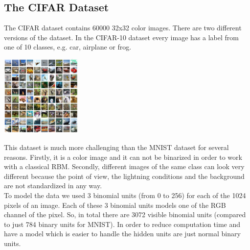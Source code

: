 \documentclass[a4paper]{scrartcl}
\begin{document}
\subsection{The CIFAR Dataset}
The CIFAR dataset contains 60000 32x32 color images. There are two different versions of the dataset. In the CIFAR-10 dataset every image has a label from one of 10 classes, e.g. car, airplane or frog. 
\begin{center}
\includegraphics[width=4cm]{images/cifar-10.png}
\end{center} 
This dataset is much more challenging than the MNIST dataset for several reasons. Firstly, it is a color image and it can not be binarized in order to work with a classical RBM. Secondly, different images of the same class can look very different because the point of view, the lightning conditions and the background are not standardized in any way. \\
To model the data we used 3 binomial units (from 0 to 256) for each of the 1024 pixels of an image. Each of these 3 binomial units models one of the RGB channel of the pixel. So, in total there are 3072 visible binomial units (compared to just 784 binary units for MNIST).
In order to reduce computation time and have a model which is easier to handle the hidden units are just normal binary units.
\end{document}
